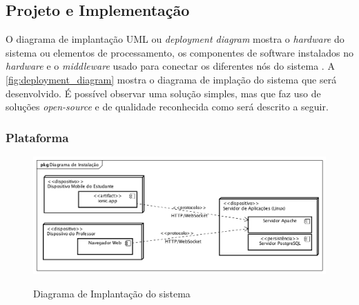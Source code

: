\subsection{Projeto e Implementação}
O diagrama de implantação UML ou \textit{deployment diagram} mostra o \textit{hardware}
do sistema ou elementos de processamento, os componentes de software instalados
no \textit{hardware} e o \textit{middleware} usado para conectar os diferentes
nós do sistema \cite{Pressman2009}. A \autoref{fig:deployment_diagram} mostra
o diagrama de implação do sistema que será desenvolvido. É possível observar
uma solução simples, mas que faz uso de soluções \textit{open-source} e de
qualidade reconhecida como será descrito a seguir.

\subsubsection{Plataforma}


\begin{figure}[!htb]
  \centering
  \caption{Diagrama de Implantação do sistema}
  \includegraphics[width=1\textwidth]{imagens/deployment_diagram}
  \label{fig:deployment_diagram}
\end{figure}
